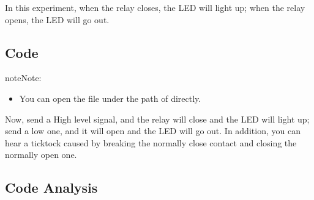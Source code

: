 \documentclass[a4paper,11pt,english]{sphinxmanual}
\begin{document}
\sphinxAtStartPar
In this experiment, when the relay closes, the LED will light up; when the relay opens, the LED will go out.


\subsection{Code}
\label{\detokenize{Basic_Project/2_Channel_Relay_Module:code}}
\begin{sphinxadmonition}{note}{Note:}\begin{itemize}
\item {} 
\sphinxAtStartPar
You can open the file  under the path of  directly.

\end{itemize}
\end{sphinxadmonition}

\sphinxAtStartPar
Now, send a High level signal, and the relay will close and the LED will light up; send a low one, and it will open and the LED will go out. In addition, you can hear a tick\sphinxhyphen{}tock caused by breaking the normally close contact and closing the normally open one.


\subsection{Code Analysis}
\label{\detokenize{Basic_Project/2_Channel_Relay_Module:code-analysis}}
\begin{sphinxVerbatim}[commandchars=\\\{\}]
\end{sphinxVerbatim}
\end{document}
